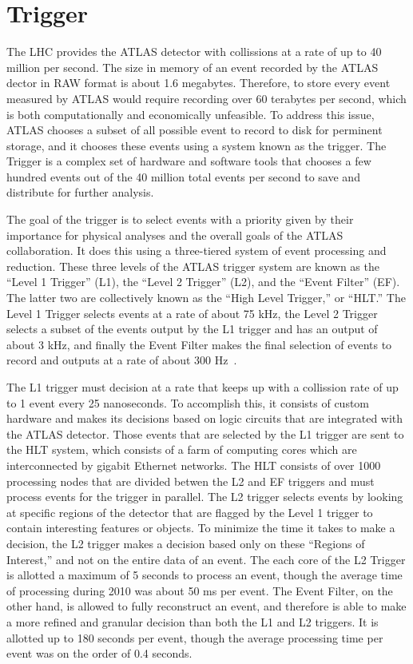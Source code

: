 \section{Trigger}
The LHC provides the ATLAS detector with collissions at a rate of up to 40 million per second.
The size in memory of an event recorded by the ATLAS dector in RAW format is about 1.6 megabytes.
Therefore, to store every event measured by ATLAS would require recording over 60 terabytes
per second, which is both computationally and economically unfeasible.
To address this issue, ATLAS chooses a subset of all possible event to record to disk for
perminent storage, and it chooses these events using a system known as the trigger.
The Trigger is a complex set of hardware and software tools that chooses a few hundred
events out of the 40 million total events per second to save and distribute for further
analysis.

The goal of the trigger is to select events with a priority given by their importance
for physical analyses and the overall goals of the ATLAS collaboration.
It does this using a three-tiered system of event processing and reduction.
These three levels of the ATLAS trigger system are known as the ``Level 1 Trigger'' (L1),
the ``Level 2 Trigger'' (L2), and the ``Event Filter'' (EF).
The latter two are collectively known as the ``High Level Trigger,'' or ``HLT.''
The Level 1 Trigger selects events at a rate of about 75 kHz,
the Level 2 Trigger selects a subset of the events output by the L1 trigger and
has an output of about 3 kHz, and finally the Event Filter makes the final selection
of events to record and outputs at a rate of about 300 Hz~\cite{http://arxiv.org/pdf/1110.1530v2.pdf}.

The L1 trigger must decision at a rate that keeps up with a collission rate of
up to 1 event every 25 nanoseconds.
To accomplish this, it consists of custom hardware and makes its decisions based
on logic circuits that are integrated with the ATLAS detector.
Those events that are selected by the L1 trigger are sent to the HLT system, which
consists of a farm of computing cores which are interconnected by gigabit Ethernet
networks.
The HLT consists of over 1000 processing nodes that are divided betwen the L2
and EF triggers and must process events for the trigger in parallel.
The L2 trigger selects events by looking at specific regions of the detector
that are flagged by the Level 1 trigger to contain interesting features
or objects.
To minimize the time it takes to make a decision, the L2 trigger makes a decision
based only on these ``Regions of Interest,'' and not on the entire data of an event.
The each core of the L2 Trigger is allotted a maximum of 5 seconds to process an event,
though the average time of processing during 2010 was about 50 ms per event.
The Event Filter, on the other hand, is allowed to fully reconstruct an event, and
therefore is able to make a more refined and granular decision than both the L1 and L2 triggers.
It is allotted up to 180 seconds per event, though the average processing time per event
was on the order of 0.4 seconds.

